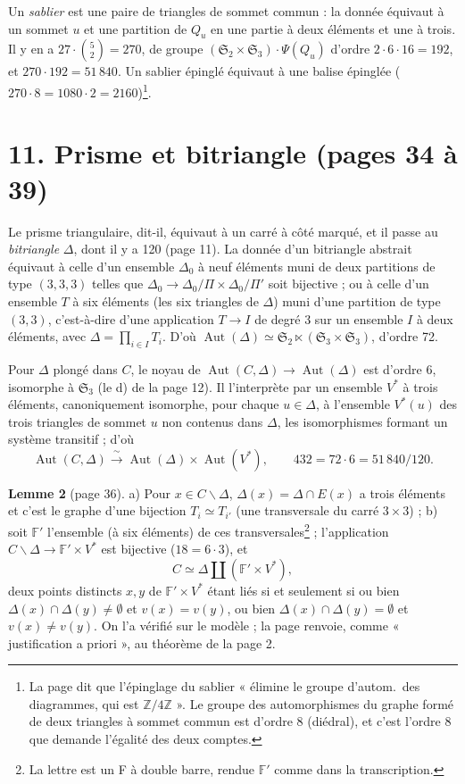 \documentclass[11pt,a4paper]{article}
\begin{document}
Un \emph{sablier} est une paire de triangles de sommet commun : la donnée
équivaut à un sommet $u$ et une partition de $Q_u$ en une partie à deux
éléments et une à trois. Il y en a $27 \cdot \binom 52 = 270$, de groupe
$(\mathfrak{S}_2 \times \mathfrak{S}_3) \cdot \Psi(Q_u)$ d'ordre $2 \cdot 6
\cdot 16 = 192$, et $270 \cdot 192 = 51\,840$. Un sablier épinglé équivaut à
une balise épinglée ($270 \cdot 8 = 1080 \cdot 2 = 2160$)\footnote{La page
dit que l'épinglage du sablier « élimine le groupe d'autom.\ des diagrammes,
qui est $\mathbb{Z}/4\mathbb{Z}$ ». Le groupe des automorphismes du graphe
formé de deux triangles à sommet commun est d'ordre 8 (diédral), et c'est
l'ordre 8 que demande l'égalité des deux comptes.}.

\section*{11. Prisme et bitriangle (pages 34 à 39)}

Le prisme triangulaire, dit-il, équivaut à un carré à côté marqué, et il passe
au \emph{bitriangle} $\Delta$, dont il y a 120 (page 11). La donnée d'un
bitriangle abstrait équivaut à celle d'un ensemble $\Delta_0$ à neuf éléments
muni de deux partitions de type $(3,3,3)$ telles que $\Delta_0 \to
\Delta_0/\Pi \times \Delta_0/\Pi'$ soit bijective ; ou à celle d'un ensemble
$T$ à six éléments (les six triangles de $\Delta$) muni d'une partition de type
$(3, 3)$, c'est-à-dire d'une application $T \to I$ de degré 3 sur un ensemble
$I$ à deux éléments, avec $\Delta = \prod_{i \in I} T_i$. D'où
$\operatorname{Aut}(\Delta) \simeq \mathfrak{S}_2 \ltimes (\mathfrak{S}_3
\times \mathfrak{S}_3)$, d'ordre 72.

Pour $\Delta$ plongé dans $C$, le noyau de $\operatorname{Aut}(C, \Delta) \to
\operatorname{Aut}(\Delta)$ est d'ordre 6, isomorphe à $\mathfrak{S}_3$ (le d)
de la page 12). Il l'interprète par un ensemble $V^*$ à trois éléments,
canoniquement isomorphe, pour chaque $u \in \Delta$, à l'ensemble $V^*(u)$ des
trois triangles de sommet $u$ non contenus dans $\Delta$, les isomorphismes
formant un système transitif ; d'où
\[
\operatorname{Aut}(C, \Delta) \xrightarrow{\ \sim\ } \operatorname{Aut}(\Delta)
\times \operatorname{Aut}(V^*), \qquad 432 = 72 \cdot 6 = 51\,840/120 .
\]

\textbf{Lemme 2} (page 36). a) Pour $x \in C \smallsetminus \Delta$,
$\Delta(x) = \Delta \cap E(x)$ a trois éléments et c'est le graphe d'une
bijection $T_i \simeq T_{i'}$ (une transversale du carré $3 \times 3$) ; b)
soit $\mathbb{F}'$ l'ensemble (à six éléments) de ces transversales\footnote{La
lettre est un F à double barre, rendue $\mathbb{F}'$ comme dans la
transcription.} ; l'application $C \smallsetminus \Delta \to \mathbb{F}' \times
V^*$ est bijective ($18 = 6 \cdot 3$), et
\[
C \simeq \Delta \amalg (\mathbb{F}' \times V^*) ,
\]
deux points distincts $x, y$ de $\mathbb{F}' \times V^*$ étant liés si et
seulement si ou bien $\Delta(x) \cap \Delta(y) \neq \emptyset$ et $v(x) = v(y)$,
ou bien $\Delta(x) \cap \Delta(y) = \emptyset$ et $v(x) \neq v(y)$. On l'a
vérifié sur le modèle ; la page renvoie, comme « justification a priori », au
théorème de la page 2.
\end{document}
